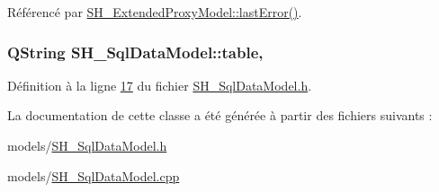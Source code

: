 Référencé par \hyperlink{classSH__ExtendedProxyModel_afb11fa89e1181d88843ea0f7fb3fe654}{S\-H\-\_\-\-Extended\-Proxy\-Model\-::last\-Error()}.

\hypertarget{classSH__SqlDataModel_afd3e2e62c847463c5177ccad35ad4992}{
\subsubsection[{table}]{\setlength{\rightskip}{0pt plus 5cm}Q\-String S\-H\-\_\-\-Sql\-Data\-Model\-::table\hspace{0.3cm}{\ttfamily [read]}, {\ttfamily [write]}}}\label{classSH__SqlDataModel_afd3e2e62c847463c5177ccad35ad4992}


Définition à la ligne \hyperlink{SH__SqlDataModel_8h_source_l00017}{17} du fichier \hyperlink{SH__SqlDataModel_8h_source}{S\-H\-\_\-\-Sql\-Data\-Model.\-h}.



La documentation de cette classe a été générée à partir des fichiers suivants \-:\begin{DoxyCompactItemize}
\item 
models/\hyperlink{SH__SqlDataModel_8h}{S\-H\-\_\-\-Sql\-Data\-Model.\-h}\item 
models/\hyperlink{SH__SqlDataModel_8cpp}{S\-H\-\_\-\-Sql\-Data\-Model.\-cpp}\end{DoxyCompactItemize}
